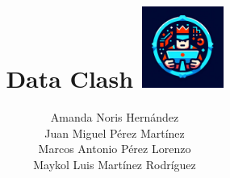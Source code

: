 \documentclass[spanish]{article}
\title{
  \textbf{Data Clash}
  \linebreak \linebreak
  \includegraphics[width=0.2\textwidth]{../images/logo.jpeg}
}
\author{
  Amanda Noris Hern\'andez \\
  Juan Miguel P\'erez Mart\'inez \\
  Marcos Antonio P\'erez Lorenzo \\
  Maykol Luis Martínez Rodr\'iguez \\
}
\begin{document}
  \maketitle
  \pagebreak
  \tableofcontents
  \pagebreak
  
  
  
  
  
  
  
\end{document}
